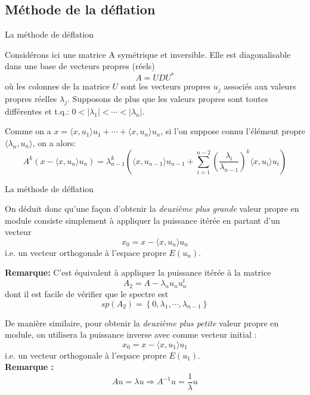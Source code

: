 \documentclass[french, 10pt]{beamer}
\theoremstyle{definition}
\begin{document}
\subsection{Méthode de la déflation}

\begin{frame}{La méthode de déflation \cite{tonnoir2018}}
	
	Considérons ici une matrice A symétrique et inversible. Elle est diagonalisable dans une base de vecteurs propres (réels)
	$$
	A=U D U^*
	$$
	où les colonnes de la matrice $U$ sont les vecteurs propres $u_j$ associés aux valeurs propres réelles $\lambda_j$.
	Supposons de plus que les valeurs propres sont toutes différentes et t.q.: $0<\left|\lambda_1\right|<\cdots<\left|\lambda_n\right|$.
	
	Comme on a $x=\langle x, u_1\rangle u_1+\cdots+\langle x, 
	u_n\rangle u_n$, si l'on suppose connu l'élément propre $\langle \lambda_n, u_n\rangle$, on a alors:
	$$
	A^k \left( x - \langle x, u_n \rangle u_n \right) = \lambda_{n-1}^k \left( \langle x, u_{n-1} \rangle u_{n-1} + \sum_{i=1}^{n-2} \left( \frac{\lambda_i}{\lambda_{n-1}} \right)^k \langle x, u_i \rangle u_i \right)
	$$
\end{frame}
\begin{frame}{La méthode de déflation}
	
	On déduit donc qu'une façon d'obtenir la \textit{deuxième plus grande} valeur propre en module consiste simplement à appliquer la puissance itérée en partant d'un vecteur
	$$
	x_0=x-\langle x, u_n \rangle u_n
	$$
	i.e. un vecteur orthogonale à l'espace propre $E\left(u_n\right)$.
	
	\textbf{Remarque:}
	C'est équivalent à appliquer la puissance itérée à la matrice
	$$
	A_2=A-\lambda_n u_n u_n^t
	$$
	dont il est facile de vérifier que le spectre est
	$$
	sp\left(A_2\right)=\left\{0, \lambda_1, \cdots, \lambda_{n-1}\right\}
	$$
	
\end{frame}
\begin{frame}
	De manière similaire, pour obtenir la \textit{deuxième plus petite} valeur propre en module, on utilisera la puissance inverse avec comme vecteur initial : 
	$$x_0 = x-\langle x,u_1 \rangle u_1$$ i.e. un vecteur orthogonale à l'espace propre $E(u_1)$. \\  
	\textbf{Remarque :}
	$$Au=\lambda u \Rightarrow  A^{-1}u = \frac{1}{\lambda}u$$
\end{frame}
\end{document}
